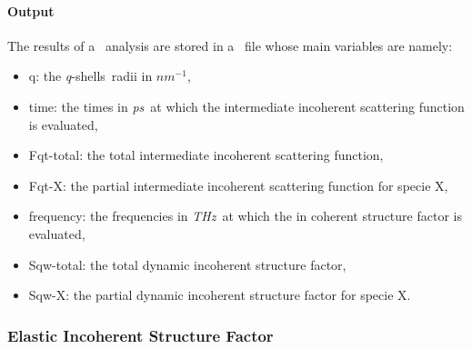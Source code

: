 \documentclass[a4paper,11pt]{report}
\newcommand{\ps}{\textit{ps}}
\newcommand{\invnm}{$nm^{-1}$}
\newcommand{\thz}{\textit{THz}}
\newcommand{\qshells}{\textit{q}-shells}
\begin{document}
\paragraph{Output\\}
The results of a \DISFG\ analysis are stored in a \NetCDF\ file whose main variables are namely:
\begin{itemize}
\item q: the \qshells\ radii in \invnm ,
\item time: the times in \ps\ at which the intermediate incoherent scattering function is evaluated,
\item Fqt-total: the total intermediate incoherent scattering function,
\item Fqt-X: the partial intermediate incoherent scattering function for specie X,
\item frequency: the frequencies in \thz\ at which the in coherent structure factor is evaluated,
\item Sqw-total: the total dynamic incoherent structure factor,
\item Sqw-X: the partial dynamic incoherent structure factor for specie X.
\end{itemize}

\subsubsection{Elastic Incoherent Structure Factor}
\label{eisf}
\end{document}
